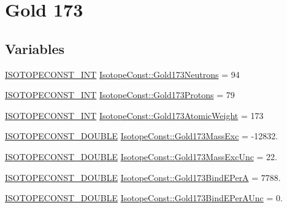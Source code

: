 \hypertarget{group___isotope_const-_gold-_au173}{}\section{Gold 173}
\label{group___isotope_const-_gold-_au173}
\subsection*{Variables}
\begin{DoxyCompactItemize}
\item 
\mbox{\hyperlink{group___isotope_const-_macros_ga5f18360b3e99483a35c32d789e62621c}{I\+S\+O\+T\+O\+P\+E\+C\+O\+N\+S\+T\+\_\+\+I\+NT}} \mbox{\hyperlink{group___isotope_const-_gold-_au173_ga07ae3dfb25bc518b411d72df65059d9e}{Isotope\+Const\+::\+Gold173\+Neutrons}} = 94
\item 
\mbox{\hyperlink{group___isotope_const-_macros_ga5f18360b3e99483a35c32d789e62621c}{I\+S\+O\+T\+O\+P\+E\+C\+O\+N\+S\+T\+\_\+\+I\+NT}} \mbox{\hyperlink{group___isotope_const-_gold-_au173_ga921ffc79975ab655b1b2c88eebb62565}{Isotope\+Const\+::\+Gold173\+Protons}} = 79
\item 
\mbox{\hyperlink{group___isotope_const-_macros_ga5f18360b3e99483a35c32d789e62621c}{I\+S\+O\+T\+O\+P\+E\+C\+O\+N\+S\+T\+\_\+\+I\+NT}} \mbox{\hyperlink{group___isotope_const-_gold-_au173_ga32a7bfaba1698303cc8fb36586818670}{Isotope\+Const\+::\+Gold173\+Atomic\+Weight}} = 173
\item 
\mbox{\hyperlink{group___isotope_const-_macros_ga8f45a7272ce02c0b4c65c44636ed719a}{I\+S\+O\+T\+O\+P\+E\+C\+O\+N\+S\+T\+\_\+\+D\+O\+U\+B\+LE}} \mbox{\hyperlink{group___isotope_const-_gold-_au173_ga6538827d09643f2ac15031f0d418cdc0}{Isotope\+Const\+::\+Gold173\+Mass\+Exc}} = -\/12832.
\item 
\mbox{\hyperlink{group___isotope_const-_macros_ga8f45a7272ce02c0b4c65c44636ed719a}{I\+S\+O\+T\+O\+P\+E\+C\+O\+N\+S\+T\+\_\+\+D\+O\+U\+B\+LE}} \mbox{\hyperlink{group___isotope_const-_gold-_au173_ga58fd5410950519f232f901dc3f74b40c}{Isotope\+Const\+::\+Gold173\+Mass\+Exc\+Unc}} = 22.
\item 
\mbox{\hyperlink{group___isotope_const-_macros_ga8f45a7272ce02c0b4c65c44636ed719a}{I\+S\+O\+T\+O\+P\+E\+C\+O\+N\+S\+T\+\_\+\+D\+O\+U\+B\+LE}} \mbox{\hyperlink{group___isotope_const-_gold-_au173_ga862f1ae0231e0f6fdccc0ea52f0495a4}{Isotope\+Const\+::\+Gold173\+Bind\+E\+PerA}} = 7788.
\item 
\mbox{\hyperlink{group___isotope_const-_macros_ga8f45a7272ce02c0b4c65c44636ed719a}{I\+S\+O\+T\+O\+P\+E\+C\+O\+N\+S\+T\+\_\+\+D\+O\+U\+B\+LE}} \mbox{\hyperlink{group___isotope_const-_gold-_au173_ga705c62fba0287fdc347f9fa163106cac}{Isotope\+Const\+::\+Gold173\+Bind\+E\+Per\+A\+Unc}} = 0.

\end{DoxyCompactItemize}

